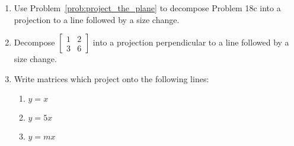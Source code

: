 \documentclass[../gatm.tex]{subfiles}
\begin{document}
\begin{enumerate}
\item Use Problem~\ref{prob:project_the_plane} to decompose Problem 18c into a projection to a line followed by a size change.
\item Decompose $\left[\begin{array}{cc} 1 & 2 \\ 3 & 6\end{array}\right]$ into a projection perpendicular to a line followed by a size change.
\item Write matrices which project onto the following lines:
\begin{multicols}{3}
\begin{enumerate}
\item $y=x$
\item $y=5x$
\item $y=mx$
\end{enumerate}
\end{multicols}
\end{enumerate}
\end{document}
